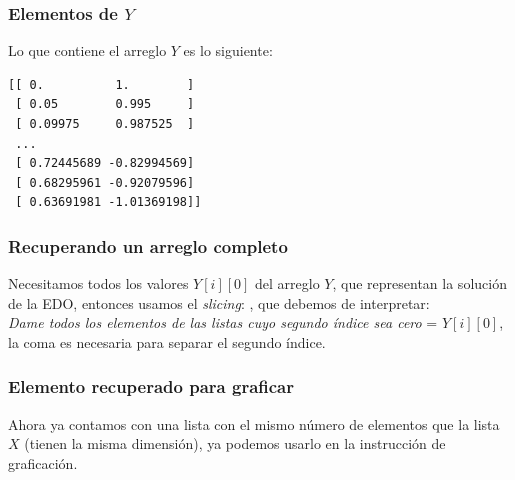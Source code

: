 \begin{frame}[fragile]
\frametitle{Elementos de $Y$}
Lo que contiene el arreglo $Y$ es lo siguiente:
\begin{verbatim}
[[ 0.          1.        ]
 [ 0.05        0.995     ]
 [ 0.09975     0.987525  ]
 ...
 [ 0.72445689 -0.82994569]
 [ 0.68295961 -0.92079596]
 [ 0.63691981 -1.01369198]]
 \end{verbatim}
\end{frame}
\begin{frame}
\frametitle{Recuperando un arreglo completo}
Necesitamos todos los valores $Y[i][0]$ del arreglo $Y$, que representan la solución de la EDO, entonces usamos el \emph{slicing}: , que debemos de interpretar:
\\
\bigskip
\emph{Dame todos los elementos de las listas cuyo segundo índice sea cero} = $Y[i][0]$, la coma es necesaria para separar el segundo índice.
\end{frame}
\begin{frame}
\frametitle{Elemento recuperado para graficar}
Ahora ya contamos con una lista con el mismo número de elementos que la lista $X$ (tienen la misma dimensión), ya podemos usarlo en la instrucción de graficación.
\end{frame}

